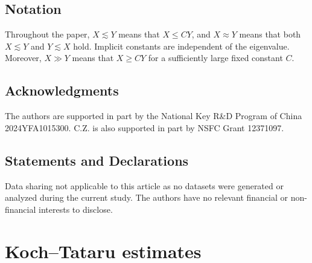 \documentclass[11pt,a4paper]{amsart}
\numberwithin{equation}{section}
\begin{document}
\subsection{Notation}
Throughout the paper, \(X\lesssim Y\) means that \(X\le CY\), and
\(X\approx Y\) means that both \(X\lesssim Y\) and \(Y\lesssim X\) hold.
Implicit constants are independent of the eigenvalue. Moreover,
\(X\gg Y\) means that \(X\ge CY\) for a sufficiently large fixed constant
\(C\).

\subsection{Acknowledgments}
The authors are supported in part by the National Key R\&D Program of China
2024YFA1015300.  C.Z. is also supported in part by NSFC Grant 12371097.
\subsection{Statements and Declarations}
Data sharing not applicable to this article as no datasets were generated or analyzed during the current study. The authors have no relevant financial or non-financial interests to disclose.
\section{Koch--Tataru estimates}\label{sec:local}
\end{document}
